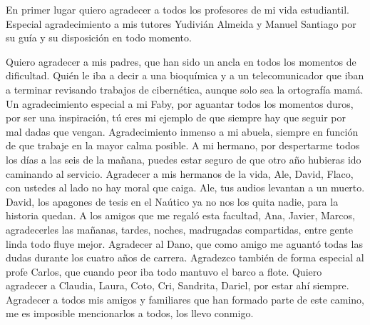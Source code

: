 \begin{acknowledgements}
    En primer lugar quiero agradecer a todos los profesores de mi vida estudiantil. Especial agradecimiento a mis 
tutores  Yudivián Almeida y Manuel Santiago por su guía y su disposición en todo momento.

    Quiero agradecer a mis padres, que han sido un ancla en todos los momentos de dificultad. Quién le iba a decir a 
una bioquímica y a un telecomunicador que iban a terminar revisando trabajos de cibernética, aunque solo sea la 
ortografía mamá. Un agradecimiento especial a mi Faby, por aguantar todos los momentos duros, por ser una inspiración, 
tú eres mi ejemplo de que siempre hay que seguir por mal dadas que vengan. Agradecimiento inmenso a mi abuela, siempre en función 
de que trabaje en la mayor calma posible. A mi hermano, por despertarme todos los días a las seis de la mañana, puedes 
estar seguro de que otro año hubieras ido caminando al servicio. Agradecer a mis hermanos de la vida, Ale, David, Flaco, 
con ustedes al lado no hay moral que caiga. Ale, tus audios levantan a un muerto. David, los apagones de tesis en el 
Naútico ya no nos los quita nadie, para la historia quedan. A los amigos que me regaló esta facultad, Ana, Javier, Marcos, 
agradecerles las mañanas, tardes, noches, madrugadas compartidas, entre gente linda todo fluye mejor. Agradecer al Dano, que como 
amigo me aguantó todas las dudas durante los cuatro años de carrera. Agradezco también de forma especial al profe Carlos, que cuando 
peor iba todo mantuvo el barco a flote. Quiero agradecer a Claudia, Laura, Coto, Cri, Sandrita, Dariel, por estar ahí siempre.
Agradecer a todos mis amigos y familiares que han formado parte de este camino, me es imposible mencionarlos a todos, 
los llevo conmigo. 
\end{acknowledgements}
